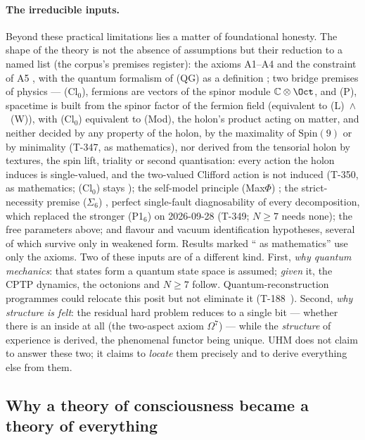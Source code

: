 \paragraph{The irreducible inputs.} Beyond these practical limitations lies a
matter of foundational honesty. The shape of the theory is not the absence of
assumptions but their reduction to a named list (the corpus's premises register):
the axioms A1--A4 and the constraint of A5 , with the quantum formalism
of (QG) as a definition ; two bridge premises of physics  ---
(Cl$_0$), fermions are vectors of the spinor module $\mathbb{C}\otimes\Oct$, and
(P), spacetime is built from the spinor factor of the fermion field (equivalent to
(L)~$\wedge$~(W)), with (Cl$_0$) equivalent to (Mod), the holon's product acting on
matter, and neither decided by any property of the holon, by the maximality of
$\mathrm{Spin}(9)$ or by minimality (T-347,  as mathematics), nor derived from the
tensorial holon by textures, the spin lift, triality or second quantisation: every action
the holon induces is single-valued, and the two-valued Clifford action is not induced
(T-350,  as mathematics; (Cl$_0$) stays ); the self-model principle (Max$\Phi$) ; the
strict-necessity premise ($\Sigma_6$) , perfect single-fault diagnosability of every
decomposition, which replaced the stronger (P1$_6$) on 2026-09-28 (T-349; $N \geq 7$ needs
none); the free
parameters above; and flavour and vacuum identification hypotheses, several of which
survive only in weakened form. Results marked `` as mathematics'' use
only the axioms. Two of these inputs are of a different kind. First, \emph{why
quantum mechanics}: that states form a quantum state space is assumed; \emph{given}
it, the CPTP dynamics, the octonions and $N \geq 7$ follow. Quantum-reconstruction
programmes could relocate this posit but not eliminate it
(T-188~). Second, \emph{why structure is felt}: the
residual hard problem reduces to a single bit --- whether there is an inside at
all (the two-aspect axiom $\Omega^7$) --- while the \emph{structure} of experience
is derived, the phenomenal functor being unique. UHM does not claim to answer
these two; it claims to \emph{locate} them precisely and to derive everything
else from them.

\subsection{Why a theory of consciousness became a theory of everything}

